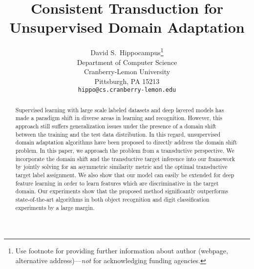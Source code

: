 \documentclass{article}
\title{Consistent Transduction for Unsupervised Domain Adaptation}
\author{
  David S.~Hippocampus\thanks{Use footnote for providing further
    information about author (webpage, alternative
    address)---\emph{not} for acknowledging funding agencies.} \\
  Department of Computer Science\\
  Cranberry-Lemon University\\
  Pittsburgh, PA 15213 \\
  \texttt{hippo@cs.cranberry-lemon.edu} \\
}
\begin{document}
 

\maketitle

\begin{abstract} 
Supervised learning with large scale labeled datasets and deep layered models has made a paradigm shift in diverse areas in learning and recognition. However, this approach still suffers generalization issues under the presence of a domain shift between the training and the test data distribution. In this regard, unsupervised domain adaptation algorithms have been proposed to directly address the domain shift problem. In this paper, we approach the problem from a transductive perspective. We incorporate the domain shift and the transductive target inference into our framework by jointly solving for an asymmetric similarity metric and the optimal transductive target label assignment. We also show that our model can easily be extended for deep feature learning in order to learn features which are discriminative in the target domain. Our experiments show that the proposed method significantly outperforms state-of-the-art algorithms in both object recognition and digit classification experiments by a large margin.
\end{abstract} 
\end{document}
